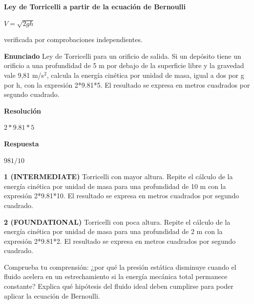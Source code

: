 \documentclass{book}
\begin{document}
\begin{tcolorbox}[title={Derivaciones}, studiumdef, breakable]

\noindent\textbf{Ley de Torricelli a partir de la ecuación de Bernoulli}

\(V = \sqrt{2 g h}\)

\noindent\footnotesize verificada por comprobaciones independientes.
\end{tcolorbox}

\begin{tcolorbox}[title={Problema resuelto}, studiumworked, breakable]

\noindent\textbf{Enunciado}
Ley de Torricelli para un orificio de salida. Si un depósito tiene un orificio a una profundidad de 5 m por debajo de la superficie libre y la gravedad vale 9,81 m/s\(^{2}\), calcula la energía cinética por unidad de masa, igual a dos por g por h, con la expresión 2*9.81*5. El resultado se expresa en metros cuadrados por segundo cuadrado.

\noindent\textbf{Resolución}

\(2*9.81*5\)

\noindent\textbf{Respuesta}

\(981/10\)
\end{tcolorbox}

\begin{tcolorbox}[title={Ejercicios}, studiumworked, breakable]

\noindent\textbf{1 (INTERMEDIATE)}
Torricelli con mayor altura. Repite el cálculo de la energía cinética por unidad de masa para una profundidad de 10 m con la expresión 2*9.81*10. El resultado se expresa en metros cuadrados por segundo cuadrado.

\noindent\textbf{2 (FOUNDATIONAL)}
Torricelli con poca altura. Repite el cálculo de la energía cinética por unidad de masa para una profundidad de 2 m con la expresión 2*9.81*2. El resultado se expresa en metros cuadrados por segundo cuadrado.
\end{tcolorbox}

\begin{tcolorbox}[title={Autoficha}, studiumcheck, breakable]

Comprueba tu comprensión: ¿por qué la presión estática disminuye cuando el fluido acelera en un estrechamiento si la energía mecánica total permanece constante? Explica qué hipótesis del fluido ideal deben cumplirse para poder aplicar la ecuación de Bernoulli.
\end{tcolorbox}
\end{document}
